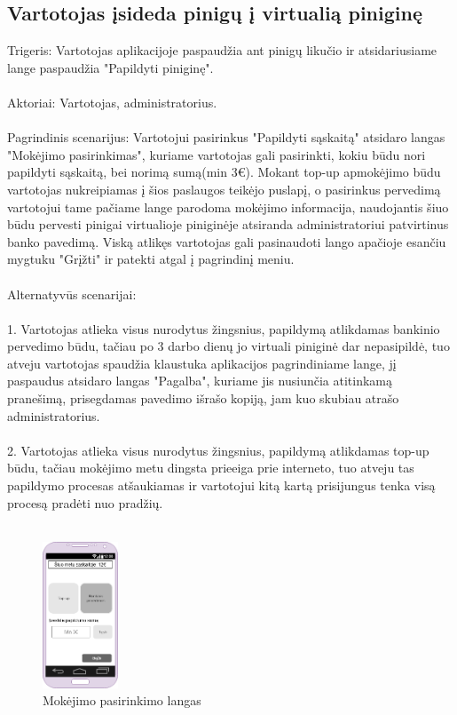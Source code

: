 \documentclass[oneside]{VUMIFPSkursinis}
\begin{document}
\subsection{Vartotojas įsideda pinigų į virtualią piniginę}
Trigeris: Vartotojas aplikacijoje paspaudžia ant pinigų likučio ir atsidariusiame lange paspaudžia "Papildyti piniginę". \\ \\ 
Aktoriai: Vartotojas, administratorius. \\ \\
Pagrindinis scenarijus: Vartotojui pasirinkus "Papildyti sąskaitą" atsidaro langas "Mokėjimo pasirinkimas", kuriame vartotojas gali pasirinkti, kokiu būdu nori papildyti sąskaitą, bei norimą sumą(min 3€). Mokant top-up apmokėjimo būdu vartotojas nukreipiamas į šios paslaugos teikėjo puslapį, o pasirinkus pervedimą vartotojui tame pačiame lange parodoma mokėjimo informacija, naudojantis šiuo būdu pervesti pinigai virtualioje piniginėje atsiranda administratoriui patvirtinus banko pavedimą. Viską atlikęs vartotojas gali pasinaudoti lango apačioje esančiu mygtuku "Grįžti" ir patekti atgal į pagrindinį meniu. \\ \\
Alternatyvūs scenarijai: \\ \\ 
1. Vartotojas atlieka visus nurodytus žingsnius, papildymą atlikdamas bankinio pervedimo būdu, tačiau po 3 darbo dienų jo virtuali piniginė dar nepasipildė, tuo atveju   vartotojas spaudžia klaustuka aplikacijos pagrindiniame lange, jį paspaudus atsidaro langas "Pagalba", kuriame jis nusiunčia atitinkamą pranešimą, prisegdamas pavedimo išrašo kopiją, jam kuo skubiau atrašo administratorius. \\ \\
2. Vartotojas atlieka visus nurodytus žingsnius, papildymą atlikdamas top-up būdu, tačiau mokėjimo metu dingsta prieeiga prie interneto, tuo atveju tas papildymo procesas atšaukiamas ir vartotojui kitą kartą prisijungus tenka visą procesą pradėti nuo pradžių. \\ \\
\begin{figure}[h]
    \centering
    \includegraphics[width=0.20\textwidth]{Mokejimo_Pasirinkimas.png}
    \caption{Mokėjimo pasirinkimo langas}
    \label{fig:apmokejimas}
\end{figure}
\end{document}
